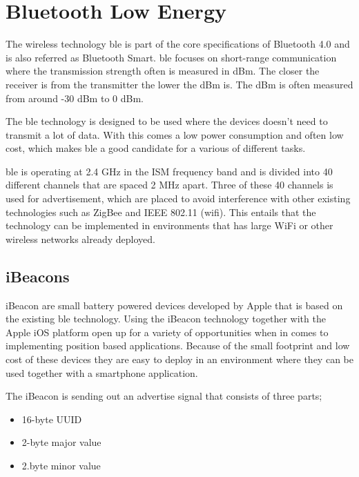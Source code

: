 \section{Bluetooth Low Energy}\label{sec:theoryBle}
The wireless technology \acrfull{ble} is part of the core specifications of Bluetooth 4.0 and is also referred as Bluetooth Smart.
\acrshort{ble} focuses on short-range communication where the transmission strength often is measured in dBm.
The closer the receiver is from the transmitter the lower the dBm is.
The dBm is often measured from around -30 dBm to 0 dBm.
\cite{DevelopmentMobileIndoor2017} 

\bigskip

The \acrshort{ble} technology is designed to be used where the devices doesn't need to transmit a lot of data.
With this comes a low power consumption and often low cost, which makes \acrshort{ble} a good candidate for a various of different tasks.
\cite{PracticalFingerprintingLocalization2017} 

\bigskip

\acrshort{ble} is operating at 2.4 GHz in the ISM frequency band and is divided into 40 different channels that are spaced 2 MHz apart.
Three of these 40 channels is used for advertisement, which are placed to avoid interference with other existing technologies such as ZigBee and IEEE 802.11 (wifi).
This entails that the technology can be implemented in environments that has large WiFi or other wireless networks already deployed.
\cite{PracticalFingerprintingLocalization2017} 

\subsection{iBeacons}\label{sec:theoryBleiBeacons}
iBeacon are small battery powered devices developed by Apple that is based on the existing \acrshort{ble} technology.
Using the iBeacon technology together with the Apple iOS platform open up for a variety of opportunities when in comes to implementing position based applications.
Because of the small footprint and low cost of these devices they are easy to deploy in an environment where they can be used together with a smartphone application.
\cite{BluetoothLowEnergy2018} 

\bigskip

The iBeacon is sending out an advertise signal that consists of three parts;
\begin{itemize}
\item 16-byte UUID
\item 2-byte major value
\item 2.byte minor value \cite{GettingStartedIBeacon2014} 
\end{itemize}

